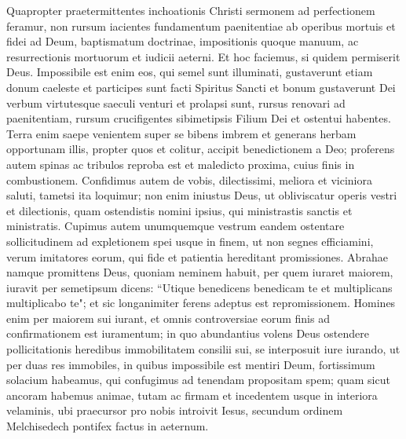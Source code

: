 \begin{biblechapter} 
\verse Quapropter praetermittentes inchoationis Christi sermonem ad perfectionem feramur, non rursum iacientes fundamentum paenitentiae ab operibus mortuis et fidei ad Deum, 
\verse baptismatum doctrinae, impositionis quoque manuum, ac resurrectionis mortuorum et iudicii aeterni. 
\verse Et hoc faciemus, si quidem permiserit Deus. 
\verse Impossibile est enim eos, qui semel sunt illuminati, gustaverunt etiam donum caeleste et participes sunt facti Spiritus Sancti 
\verse et bonum gustaverunt Dei verbum virtutesque saeculi venturi 
\verse et prolapsi sunt, rursus renovari ad paenitentiam, rursum crucifigentes sibimetipsis Filium Dei et ostentui habentes. 
\verse Terra enim saepe venientem super se bibens imbrem et generans herbam opportunam illis, propter quos et colitur, accipit benedictionem a Deo; 
\verse proferens autem spinas ac tribulos reproba est et maledicto proxima, cuius finis in combustionem. 
\verse Confidimus autem de vobis, dilectissimi, meliora et viciniora saluti, tametsi ita loquimur; 
\verse non enim iniustus Deus, ut obliviscatur operis vestri et dilectionis, quam ostendistis nomini ipsius, qui ministrastis sanctis et ministratis. 
\verse Cupimus autem unumquemque vestrum eandem ostentare sollicitudinem ad expletionem spei usque in finem, 
\verse ut non segnes efficiamini, verum imitatores eorum, qui fide et patientia hereditant promissiones. 
\verse Abrahae namque promittens Deus, quoniam neminem habuit, per quem iuraret maiorem, iuravit per semetipsum 
\verse dicens: “Utique benedicens benedicam te et multiplicans multiplicabo te"; 
\verse et sic longanimiter ferens adeptus est repromissionem. 
\verse Homines enim per maiorem sui iurant, et omnis controversiae eorum finis ad confirmationem est iuramentum; 
\verse in quo abundantius volens Deus ostendere pollicitationis heredibus immobilitatem consilii sui, se interposuit iure iurando, 
\verse ut per duas res immobiles, in quibus impossibile est mentiri Deum, fortissimum solacium habeamus, qui confugimus ad tenendam propositam spem; 
\verse quam sicut ancoram habemus animae, tutam ac firmam et incedentem usque in interiora velaminis, 
\verse ubi praecursor pro nobis introivit Iesus, secundum ordinem Melchisedech pontifex factus in aeternum. 
\end{biblechapter}

